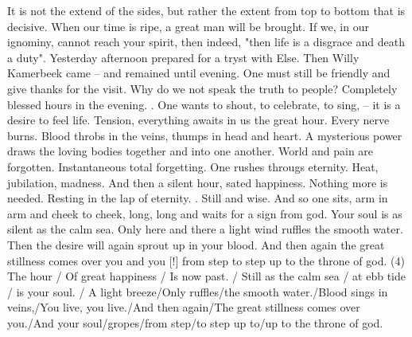 It is not the extend of the sides, but rather the extent from top to bottom that is decisive. When our time is ripe, a great man will be brought. If we, in our ignominy, cannot reach your spirit, then indeed, "then life is a disgrace and death a duty". Yesterday afternoon prepared for a tryst with Else. Then Willy Kamerbeek came -- and remained until evening. One must still be friendly and give thanks for the visit. Why do we not speak the truth to people? Completely blessed hours in the evening. . One wants to shout, to celebrate, to sing, -- it is a desire to feel life. Tension, everything awaits in us the great hour. Every nerve burns. Blood throbs in the veins, thumps in head and heart. A mysterious power draws the loving bodies together and into one another. World and pain are forgotten. Instantaneous total forgetting. One rushes througs eternity. Heat, jubilation, madness. And then a silent hour, sated happiness. Nothing more is needed. Resting in the lap of eternity. . Still and wise. And so one sits, arm in arm and cheek to cheek, long, long and waits for a sign from god. Your soul is as silent as the calm sea. Only here and there a light wind ruffles the smooth water. Then the desire will again sprout up in your blood. And then again the great stillness comes over you and you [!] from step to step up to the throne of god. (4) The hour / Of great happiness / Is now past. / Still as the calm sea / at ebb tide / is your soul. / A light breeze/Only ruffles/the smooth water./Blood sings in veins,/You live, you live./And then again/The great stillness comes over you./And your soul/gropes/from step/to step up to/up to the throne of god.

